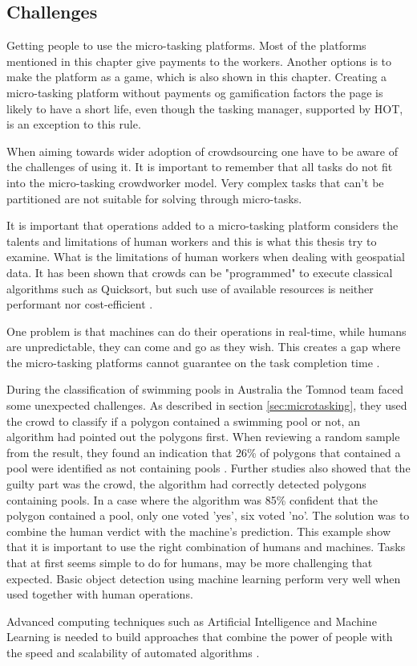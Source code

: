 \subsection{Challenges}
Getting people to use the micro-tasking platforms. Most of the platforms mentioned in this chapter give payments to the workers. Another options is to make the platform as a game, which is also shown in this chapter. Creating a micro-tasking platform without payments og gamification factors the page is likely to have a short life, even though the tasking manager, supported by HOT, is an exception to this rule. 

When aiming towards wider adoption of crowdsourcing one have to be aware of the challenges of using it. It is important to remember that all tasks do not fit into the micro-tasking crowdworker model. Very complex tasks that can't be partitioned are not suitable for solving through micro-tasks. 

It is important that operations added to a micro-tasking platform considers the talents and limitations of human workers \citep{Franklin2011} and this is what this thesis try to examine. What is the limitations of human workers when dealing with geospatial data. It has been shown that crowds can be "programmed" to execute classical algorithms such as Quicksort, but such use of available resources is neither performant nor cost-efficient \citep{Franklin2011}. 

One problem is that machines can do their operations in real-time, while humans are unpredictable, they can come and go as they wish. This creates a gap where the micro-tasking platforms cannot guarantee on the task completion time \citep{Difallah2016}. 

During the classification of swimming pools in Australia the Tomnod team faced some unexpected challenges. As described in section \ref{sec:microtasking}, they used the crowd to classify if a polygon contained a swimming pool or not, an algorithm had pointed out the polygons first. When reviewing a random sample from the result, they found an indication that 26\% of polygons that contained a pool were identified as not containing pools \citep{Kostas2016}.  Further studies also showed that the guilty part was the crowd, the algorithm had correctly detected polygons containing pools. In a case where the algorithm was 85\% confident that the polygon contained a pool, only one voted 'yes', six voted 'no'. The solution was to combine the human verdict with the machine's prediction. This example show that it is important to use the right combination of humans and machines. Tasks that at first seems simple to do for humans, may be more challenging that expected.  Basic object detection using machine learning perform very well when used together with human operations. 

Advanced computing techniques such as Artificial Intelligence and Machine Learning is needed to build approaches that combine the power of people with the speed and scalability of automated algorithms \citep{Meier2013}. 
